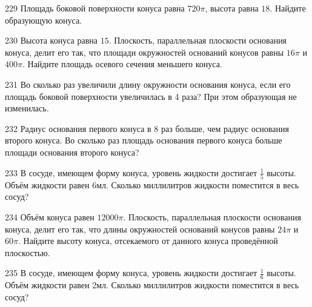 \documentclass[a4paper]{article}
\begin{document}
\begin{taskBN}{229}
Площадь боковой поверхности конуса равна $720\pi$, высота равна $18$. Найдите образующую конуса. 
\end{taskBN}

\begin{taskBN}{230}
Высота конуса равна $15$. Плоскость, параллельная плоскости основания конуса,  делит его так, что площади окружностей оснований конусов равны $16\pi$ и $400\pi$. Найдите площадь осевого сечения меньшего конуса. 
\end{taskBN}

\begin{taskBN}{231}
Во сколько раз увеличили длину окружности основания конуса, если его площадь боковой поверхности увеличилась в 4 раза? При этом образующая не изменилась.
\end{taskBN}

\begin{taskBN}{232}
Радиус основания первого конуса в 8 раз больше, чем радиус основания второго конуса. Во сколько раз площадь основания первого конуса больше площади основания второго конуса?
\end{taskBN}

\begin{taskBN}{233}
В сосуде, имеющем форму конуса, уровень жидкости достигает $\frac{1}{5}$ высоты. Объём жидкости равен 6мл. Сколько миллилитров жидкости поместится в весь сосуд?
\end{taskBN}

\begin{taskBN}{234}
Объём конуса равен $12000\pi$. Плоскость, параллельная плоскости основания конуса,  делит его так, что длины окружностей оснований конусов равны $24\pi$ и $60\pi$. Найдите высоту конуса, отсекаемого от данного конуса проведённой плоскостью. 
\end{taskBN}

\begin{taskBN}{235}
В сосуде, имеющем форму конуса, уровень жидкости достигает $\frac{1}{6}$ высоты. Объём жидкости равен 2мл. Сколько миллилитров жидкости поместится в весь сосуд?
\end{taskBN}
\end{document}
